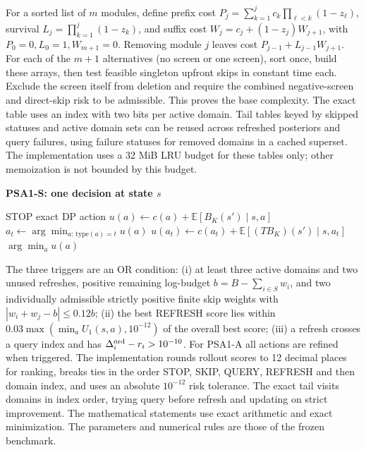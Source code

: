 \documentclass[conference]{IEEEtran}
\begin{document}
For a sorted list of $m$ modules, define prefix cost $P_j=\sum_{k=1}^{j}c_k\prod_{\ell<k}(1-z_\ell)$, survival $L_j=\prod_{k=1}^j(1-z_k)$, and suffix cost $W_j=c_j+(1-z_j)W_{j+1}$, with $P_0=0,L_0=1,W_{m+1}=0$. Removing module $j$ leaves cost $P_{j-1}+L_{j-1}W_{j+1}$. For each of the $m+1$ alternatives (no screen or one screen), sort once, build these arrays, then test feasible singleton upfront skips in constant time each. Exclude the screen itself from deletion and require the combined negative-screen and direct-skip risk to be admissible. This proves the base complexity. The exact table uses an index with two bits per active domain. Tail tables keyed by skipped statuses and active domain sets can be reused across refreshed posteriors and query failures, using failure statuses for removed domains in a cached superset. The implementation uses a 32 MiB LRU budget for these tables only; other memoization is not bounded by this budget.

\noindent\textbf{PSA1-S: one decision at state $s$}
\begin{algorithmic}[1]
 \RETURN STOP \ENDIF
{} \RETURN exact DP action \ENDIF
{}
\STATE $u(a)\gets c(a)+\mathbb E[B_K(s')\mid s,a]$
\ENDFOR
{}
\STATE $a_t\gets\arg\min_{a:\,\mathrm{type}(a)=t}u(a)$
\STATE $u(a_t)\gets c(a_t)+\mathbb E[(TB_K)(s')\mid s,a_t]$
\ENDFOR
\ENDIF
\RETURN $\arg\min_a u(a)$
\end{algorithmic}
The three triggers are an OR condition: (i) at least three active domains and two unused refreshes, positive remaining log-budget $b=B-\sum_{i\in S}w_i$, and two individually admissible strictly positive finite skip weights with $|w_i+w_j-b|\le0.12b$; (ii) the best REFRESH score lies within $0.03\max(\min_a U_1(s,a),10^{-12})$ of the overall best score; (iii) a refresh crosses a query index and has $\Delta_i^{\rm ord}-r_i>10^{-10}$. For PSA1-A all actions are refined when triggered. The implementation rounds rollout scores to 12 decimal places for ranking, breaks ties in the order STOP, SKIP, QUERY, REFRESH and then domain index, and uses an absolute $10^{-12}$ risk tolerance. The exact tail visits domains in index order, trying query before refresh and updating on strict improvement. The mathematical statements use exact arithmetic and exact minimization. The parameters and numerical rules are those of the frozen benchmark.
\end{document}
